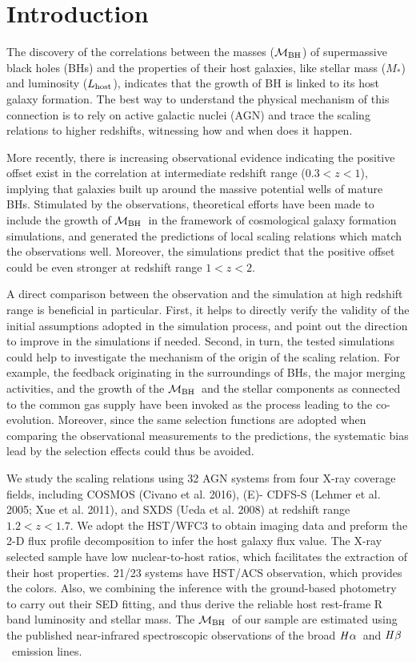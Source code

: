 \documentclass{natureprintstyle}
\newcommand{\mbh}{$\mathcal M_{\rm BH}$}
\newcommand{\lhost}{$L_{\rm host}$}
\newcommand{\halpha}{${\it H}\alpha$}
\newcommand{\hbeta}{${\it H}\beta$}
\newcommand{\mstar}{{$M_*$}}
\begin{document}
\section{Introduction}
The discovery of the correlations between the masses (\mbh) of supermassive black holes (BHs) and the properties of their host galaxies, like stellar mass (\mstar) and luminosity (\lhost), indicates that the growth of BH is linked to its host galaxy formation. The best way to understand the physical mechanism of this connection is to rely on active galactic nuclei (AGN) and trace the scaling relations to higher redshifts, witnessing how and when does it happen.

More recently, there is increasing observational evidence indicating the positive offset exist in the correlation at intermediate redshift range ($0.3<z<1$), implying that galaxies built up around the massive potential wells of mature BHs. Stimulated by the observations, theoretical efforts have been made to include the growth of \mbh\ in the framework of cosmological galaxy formation simulations, and generated the predictions of local scaling relations which match the observations well. Moreover, the simulations predict that the positive offset could be even stronger at redshift range $1<z<2$. 

A direct comparison between the observation and the simulation at high redshift range is beneficial in particular. First, it helps to directly verify the validity of the initial assumptions adopted in the simulation process, and point out the direction to improve in the simulations if needed. Second, in turn, the tested simulations could help to investigate the mechanism of the origin of the scaling relation. For example, the feedback originating in the surroundings of BHs, the major merging activities, and the growth of the \mbh\ and the stellar components as connected to the common gas supply have been invoked as the process leading to the co-evolution. Moreover, since the same selection functions are adopted when comparing the observational measurements to the predictions, the systematic bias lead by the selection effects could thus be avoided.

We study the scaling relations using 32 AGN systems from four X-ray coverage fields, including COSMOS (Civano et al. 2016), (E)- CDFS-S (Lehmer et al. 2005; Xue et al. 2011), and SXDS (Ueda et al. 2008) at redshift range $1.2<z<1.7$. We adopt the HST/WFC3 to obtain imaging data and preform the 2-D flux profile decomposition to infer the host galaxy flux value. The X-ray selected sample have low nuclear-to-host ratios, which facilitates the extraction of their host properties. 21/23 systems have HST/ACS observation, which provides the colors. Also, we combining the inference with the ground-based photometry to carry out their SED fitting, and thus derive the reliable host rest-frame R band luminosity and stellar mass. The \mbh\ of our sample are estimated using the published near-infrared spectroscopic observations of the broad \halpha\ and \hbeta\ emission lines.
\end{document}
